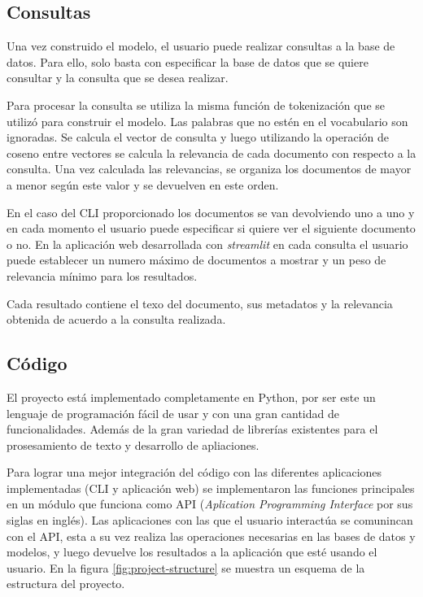 \subsection{Consultas}\label{sec:query}

Una vez construido el modelo, el usuario puede realizar consultas a la base de
datos. Para ello, solo basta con especificar la base de datos que se quiere
consultar y la consulta que se desea realizar. 

Para procesar la consulta se utiliza la misma función de tokenización que se
utilizó para construir el modelo. Las palabras que no estén en el vocabulario
son ignoradas. Se calcula el vector de consulta y luego utilizando la operación
de coseno entre vectores se calcula la relevancia de cada documento con
respecto a la consulta. Una vez calculada las relevancias, se organiza los
documentos de mayor a menor según este valor y se devuelven en este orden.

En el caso del CLI proporcionado los documentos se van devolviendo uno a uno
y en cada momento el usuario puede especificar si quiere ver el siguiente
documento o no. En la aplicación web desarrollada con \emph{streamlit} en cada
consulta el usuario puede establecer un numero máximo de documentos a mostrar
y un peso de relevancia mínimo para los resultados.

Cada resultado contiene el texo del documento, sus metadatos y la relevancia 
obtenida de acuerdo a la consulta realizada.

\subsection{Código}\label{sec:code}

El proyecto está implementado completamente en Python, por ser este un lenguaje
de programación fácil de usar y con una gran cantidad de funcionalidades. Además
de la gran variedad de librerías existentes para el prosesamiento de texto y
desarrollo de apliaciones.

Para lograr una mejor integración del código con las diferentes aplicaciones
implementadas (CLI y aplicación web) se implementaron las funciones principales
en un módulo que funciona como API (\emph{Aplication Programming Interface} por sus
siglas en inglés). Las aplicaciones con las que el usuario interactúa se
comunincan con el API, esta a su vez realiza las operaciones necesarias en las
bases de datos y modelos, y luego devuelve los resultados a la aplicación que
esté usando el usuario. En la figura \ref{fig:project-structure} se muestra un
esquema de la estructura del proyecto.


